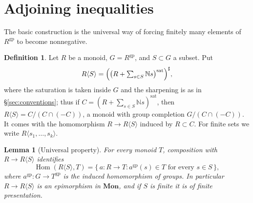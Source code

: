 \documentclass[12pt]{article}
\newcommand{\N}{\mathbb N}
\newcommand{\gp}{\mathrm{gp}}
\newcommand{\sat}{\mathrm{sat}}
\newcommand{\Hom}{\operatorname{Hom}}
\newtheorem{lemma}[theorem]{Lemma}
\theoremstyle{definition}
\newtheorem{definition}[theorem]{Definition}
\theoremstyle{remark}
\begin{document}
\section{Adjoining inequalities}
\label{sec:adjoin}

The basic construction is the universal way of forcing finitely many
elements of \(R^{\gp}\) to become nonnegative.

\begin{definition}\label{def:adjoin}
Let \(R\) be a monoid, \(G=R^{\gp}\), and \(S\subset G\) a subset.  Put
\begin{equation}
 R\langle S\rangle
  =\Bigl(\bigl(R+\textstyle\sum_{s\in S}\N s\bigr)^{\sat}\Bigr)^\sharp ,
 \label{eq:adjoin}
\end{equation}
where the saturation is taken inside \(G\) and the sharpening is as in
\S\ref{sec:conventions}; thus if \(C=(R+\sum_{s\in S}\N s)^{\sat}\), then
\(R\langle S\rangle=C/(C\cap(-C))\), a monoid with group completion
\(G/(C\cap(-C))\).  It comes with the homomorphism
\(R\to R\langle S\rangle\) induced by \(R\subset C\).  For finite sets we
write \(R\langle s_1,\dots,s_k\rangle\).
\end{definition}

\begin{lemma}[Universal property]\label{lem:universal}
For every monoid \(T\), composition with \(R\to R\langle S\rangle\)
identifies
\begin{equation}
 \Hom(R\langle S\rangle,T)
 =
 \{\,a:R\longrightarrow T:
                    a^{\gp}(s)\in T\text{ for every }s\in S\,\},
 \label{eq:universal}
\end{equation}
where \(a^{\gp}:G\to T^{\gp}\) is the induced homomorphism of groups.  In
particular \(R\to R\langle S\rangle\) is an epimorphism in \(\mathbf{Mon}\),
and if \(S\) is finite it is of finite presentation.
\end{lemma}
\end{document}
